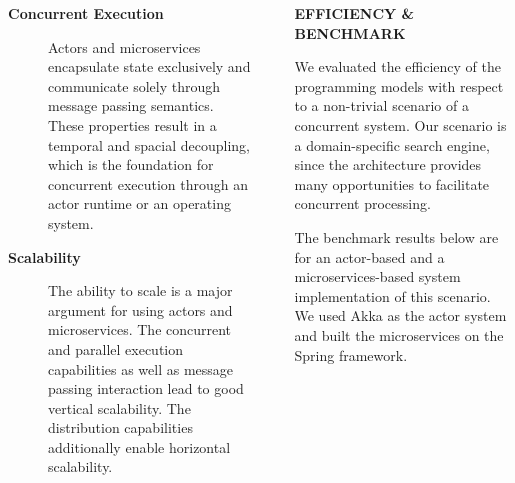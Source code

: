 \documentclass[final,hyperref={pdfpagelabels=true}]{beamer}
\begin{document}
\begin{frame}
\begin{columns}[t]
\begin{column}{.43\textwidth}
{\begin{description}
          \item[\textbf{\textsf{Concurrent Execution}}] 
          \begin{justify}
          Actors and microservices encapsulate state exclusively and communicate solely through message passing semantics. These properties result in a temporal and spacial decoupling, which is the foundation for concurrent execution through an actor runtime or an operating system.
          \end{justify}

          \vspace*{1.5\baselineskip}

          \item[\textbf{\textsf{Scalability}}] 
          \begin{justify}
          The ability to scale is a major argument for using actors and microservices. The concurrent and parallel execution capabilities as well as message passing interaction lead to good vertical scalability. The distribution capabilities additionally enable horizontal scalability.
          \end{justify}
        \end{description}
        
      }
    \end{column}
    \begin{column}{.06\textwidth}
      \end{column}
    \begin{column}{.43\textwidth}
      \textsf{\textbf{EFFICIENCY \& BENCHMARK}} \\
      \vspace*{.5\baselineskip}
      {\lmodern
        \begin{justify}
        
        We evaluated the efficiency of the programming models with respect to a non-trivial scenario of a concurrent system. Our scenario is a domain-specific search engine, since the architecture provides many opportunities to facilitate concurrent processing. 

        \vspace*{1.4\baselineskip}
        
        The benchmark results below are for an actor-based and a microservices-based system implementation of this scenario. We used Akka as the actor system and built the microservices on the Spring framework.
        \end{justify}
      }


\end{column}
\end{columns}
\end{frame}
\end{document}
